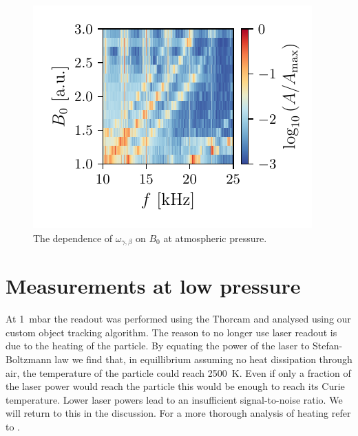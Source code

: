 \begin{figure}
    \centering
    \includegraphics{figures/data/rotational_mode_dependence_on_B0.pdf}
    \caption{The dependence of $\omega_{\gamma,\beta}$ on $B_0$ at atmospheric pressure.}
    \label{fig:rotational-mode-dependence-1bar}
\end{figure}

\section{Measurements at low pressure}
\label{sec:measurements-at-low-pressure}
At \qty{1}{\milli\bar} the readout was performed using the Thorcam and analysed using our custom object tracking algorithm. The reason to no longer use laser readout is due to the heating of the particle. By equating the power of the laser to Stefan-Boltzmann law we find that, in equillibrium assuming no heat dissipation through air, the temperature of the particle could reach \qty{2500}{\kelvin}. Even if only a fraction of the laser power would reach the particle this would be enough to reach its Curie temperature. Lower laser powers lead to an insufficient signal-to-noise ratio. We will return to this in the discussion. For a more thorough analysis of heating refer to \cite{millen}.

